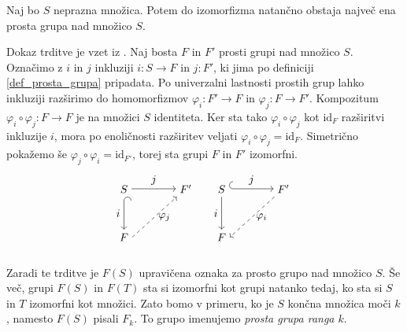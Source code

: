 \begin{trditev}
\label{trd_enolicnost_prostih_grup}
 Naj bo $S$ neprazna množica. Potem do izomorfizma natančno obstaja največ ena prosta grupa nad množico $S$.
\end{trditev}
\begin{dokaz}
Dokaz trditve je vzet iz \cite[str.~4]{Pogacnik_2024}.
Naj bosta $F$ in $F'$ prosti grupi nad množico $S$. Označimo z $i$ in $j$ inkluziji $i : S \to F$ in $j : F'$, ki jima po definiciji \ref{def_prosta_grupa} pripadata. Po univerzalni lastnosti prostih grup lahko inkluziji
razširimo do homomorfizmov $\varphi_i : F' \to F$ in $\varphi_j : F \to F'$. 
Kompozitum $\varphi_i \circ \varphi_j : F \to F$ je na množici $S$ identiteta. Ker sta tako $\varphi_i \circ \varphi_j$ kot $\text{id}_F$ razširitvi inkluzije $i$,
mora po enoličnosti razširitev veljati $\varphi_i \circ \varphi_j = \text{id}_F$. Simetrično pokažemo še $\varphi_j \circ \varphi_i  = \text{id}_{F'}$, torej sta grupi $F$ in $F'$ izomorfni.
\[
\begin{tikzpicture}
    \matrix (m1)
      [
        matrix of math nodes,
        row sep    = 3em,
        column sep = 4em
      ]
      {
        S    & F' \\
        F  &             \\
      };
    \path
      (m1-1-1) edge [{Hooks[right,length=0.8ex]}->] node [left] {$i$} (m1-2-1)
      (m1-1-1.east |- m1-1-2)
        edge [->] node [above] {$j$} (m1-1-2)
      (m1-2-1.east) edge [ ->,
        dashed] node [right] {$\varphi_j$} (m1-1-2);
\end{tikzpicture}
\quad
\begin{tikzpicture}
    \matrix (m2)
      [
        matrix of math nodes,
        row sep    = 3em,
        column sep = 4em
      ]
      {
        S    & F' \\
        F  &             \\
      };
    \path
      (m2-1-1) edge [->] node [left] {$i$} (m2-2-1)
      (m2-1-1.east |- m2-1-2)
        edge [{Hooks[right,length=0.8ex]}->] node [above] {$j$} (m2-1-2)
        (m2-1-2) edge [ ->,
        dashed] node [right] {$\varphi_i$} (m2-2-1.east) ;
\end{tikzpicture}\]
\end{dokaz}

Zaradi te trditve je $F(S)$ upravičena oznaka za prosto grupo nad množico $S$. Še več, grupi $F(S)$ in $F(T)$ sta si izomorfni kot grupi natanko tedaj, ko sta si $S$ in $T$ izomorfni kot množici.
Zato bomo v primeru, ko je $S$ končna množica moči $k$, namesto $F(S)$ pisali $F_k$. To grupo imenujemo \emph{prosta grupa ranga $k$}.

